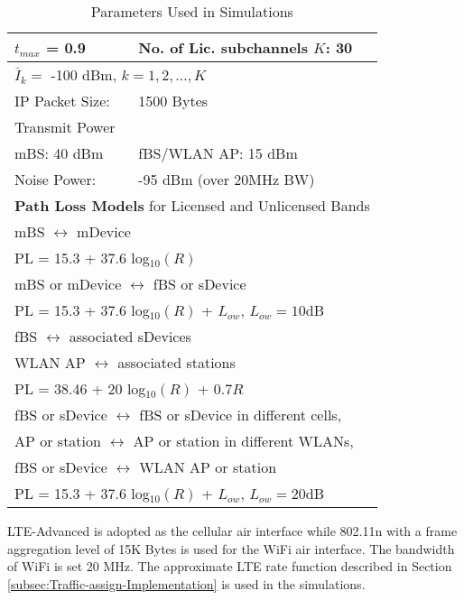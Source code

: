 \documentclass[journal,final,letterpaper,10pt,doublecolumn,twoside]{IEEEtran}
\begin{document}
\begin{table}\caption{Parameters Used in Simulations} \centering
\begin{tabular}{|ll|}
\hline
 $t_{max}$ = 0.9  &   No. of Lic. subchannels $K$: 30   \\
\hline
\multicolumn{2}{|l|}{ $\bar{I}_k =$ -100 dBm,  $k = 1, 2, \dots, K$  } \\
\hline
IP Packet Size:   & 1500 Bytes \\
\hline
Transmit Power  &            \\
mBS:      40 dBm   &      fBS/WLAN AP:      15 dBm \\
\hline
Noise Power: &  -95 dBm (over 20MHz BW)          \\
\hline

\multicolumn{2}{|l|}{\textbf{Path Loss Models} for Licensed and Unlicensed Bands}      \\
\hline \multicolumn{2}{|l|}{mBS $\leftrightarrow$ mDevice }      \\
\multicolumn{2}{|l|}{PL = 15.3 + 37.6 log$_{10}(R)$ }      \\
\hline \multicolumn{2}{|l|}{mBS or mDevice $\leftrightarrow$ fBS or sDevice }      \\
\multicolumn{2}{|l|}{PL = 15.3 + 37.6 log$_{10}(R)$ + $L_{ow}$, $L_{ow}=10$dB  }     \\
\hline
\multicolumn{2}{|l|}{fBS $\leftrightarrow$ associated sDevices }     \\
\multicolumn{2}{|l|}{WLAN AP $\leftrightarrow$ associated stations  }      \\
\multicolumn{2}{|l|}{PL = 38.46 + 20 log$_{10}(R)$ + $0.7R$ }\\
\hline
\multicolumn{2}{|l|}{fBS or sDevice $\leftrightarrow$ fBS or sDevice in different cells, }      \\
\multicolumn{2}{|l|}{AP or station $\leftrightarrow$ AP or station in different WLANs, }   \\
\multicolumn{2}{|l|}{fBS or sDevice $\leftrightarrow$ WLAN AP or station  }    \\
\multicolumn{2}{|l|}{PL = 15.3 + 37.6 log$_{10}(R)$ + $L_{ow}$, $L_{ow}=20$dB  }     \\
\hline
\end{tabular}
\label{table:parameters}
\end{table}







LTE-Advanced \cite{LTE-A} is adopted as the cellular air interface while
802.11n \cite{802.11n} with a frame aggregation level of 15K Bytes is used for the WiFi air interface.
The bandwidth of WiFi is set 20 MHz.
The approximate LTE rate function described in Section \ref{subsec:Traffic-assign-Implementation} is used in the simulations.
\end{document}
